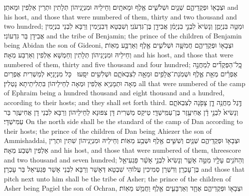 {וּצְבָא֖וֹ וּפְקֻדֵיהֶ֑ם שְׁנַ֧יִם וּשְׁלֹשִׁ֛ים אֶ֖לֶף וּמָאתָֽיִם׃}
{וְחֵילֵיהּ וּמִנְיָנֵיהוֹן תְּלָתִין וּתְרֵין אַלְפִין וּמָאתַן׃}
{and his host, and those that were numbered of them, thirty and two thousand and two hundred;}{}
{וּמַטֵּ֖ה בִּנְיָמִ֑ן וְנָשִׂיא֙ לִבְנֵ֣י בִנְיָמִ֔ן אֲבִידָ֖ן בֶּן־גִּדְעֹנִֽי׃}
{וְשִׁבְטָא דְּבִנְיָמִין וְרַבָּא לִבְנֵי בִנְיָמִין אֲבִידָן בַּר גִּדְעוֹנִי׃}
{and the tribe of Benjamin; the prince of the children of Benjamin being Abidan the son of Gideoni,}{}
{וּצְבָא֖וֹ וּפְקֻדֵיהֶ֑ם חֲמִשָּׁ֧ה וּשְׁלֹשִׁ֛ים אֶ֖לֶף וְאַרְבַּ֥ע מֵאֽוֹת׃}
{וְחֵילֵיהּ וּמִנְיָנֵיהוֹן תְּלָתִין וְחַמְשָׁא אַלְפִין וְאַרְבַּע מְאָה׃}
{and his host, and those that were numbered of them, thirty and five thousand and four hundred;}{}
{כׇּֽל־הַפְּקֻדִ֞ים לְמַחֲנֵ֣ה אֶפְרַ֗יִם מְאַ֥ת אֶ֛לֶף וּשְׁמֹֽנַת־אֲלָפִ֥ים וּמֵאָ֖ה לְצִבְאֹתָ֑ם וּשְׁלִשִׁ֖ים יִסָּֽעוּ׃ \setuma }
{כָּל מִנְיָנַיָּא לְמַשְׁרִית אֶפְרַיִם מְאָה וּתְמָנְיָא אַלְפִין וּמְאָה לְחֵילֵיהוֹן בִּתְלִיתֵיתָא נָטְלִין׃}
{all that were numbered of the camp of Ephraim being a hundred thousand and eight thousand and a hundred, according to their hosts; and they shall set forth third.}{}
{דֶּ֣גֶל מַחֲנֵ֥ה דָ֛ן צָפֹ֖נָה לְצִבְאֹתָ֑ם וְנָשִׂיא֙ לִבְנֵ֣י דָ֔ן אֲחִיעֶ֖זֶר בֶּן־עַמִּֽישַׁדָּֽי׃}
{טֵיקַס מַשְׁרִית דָּן צִפּוּנָא לְחֵילֵיהוֹן וְרַבָּא לִבְנֵי דָן אֲחִיעֶזֶר בַּר עַמִּישַׁדָּי׃}
{On the north side shall be the standard of the camp of Dan according to their hosts; the prince of the children of Dan being Ahiezer the son of Ammishaddai,}{}
{וּצְבָא֖וֹ וּפְקֻדֵיהֶ֑ם שְׁנַ֧יִם וְשִׁשִּׁ֛ים אֶ֖לֶף וּשְׁבַ֥ע מֵאֽוֹת׃}
{וְחֵילֵיהּ וּמִנְיָנֵיהוֹן שִׁתִּין וּתְרֵין אַלְפִין וּשְׁבַע מְאָה׃}
{and his host, and those that were numbered of them, threescore and two thousand and seven hundred;}{}
{וְהַחֹנִ֥ים עָלָ֖יו מַטֵּ֣ה אָשֵׁ֑ר וְנָשִׂיא֙ לִבְנֵ֣י אָשֵׁ֔ר פַּגְעִיאֵ֖ל בֶּן־עׇכְרָֽן׃}
{וְדִשְׁרַן סְמִיכִין עֲלוֹהִי שִׁבְטָא דְּאָשֵׁר וְרַבָּא לִבְנֵי אָשֵׁר פַּגְעִיאֵל בַּר עָכְרָן׃}
{and those that pitch next unto him shall be the tribe of Asher; the prince of the children of Asher being Pagiel the son of Ochran,}{}
{וּצְבָא֖וֹ וּפְקֻדֵיהֶ֑ם אֶחָ֧ד וְאַרְבָּעִ֛ים אֶ֖לֶף וַחֲמֵ֥שׁ מֵאֽוֹת׃}
